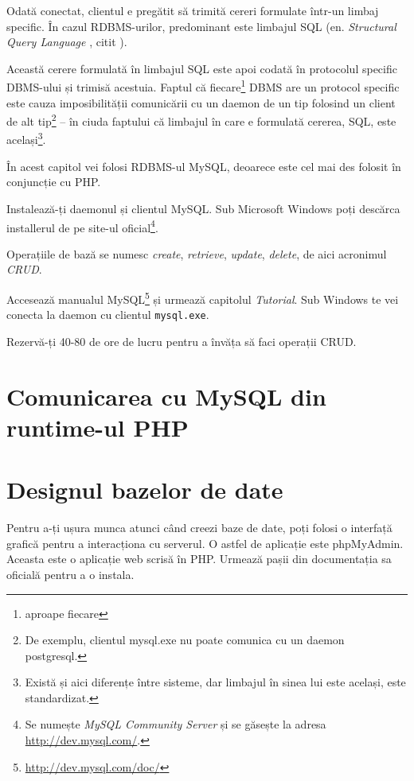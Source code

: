 Odată conectat, clientul e pregătit să trimită cereri formulate
într-un limbaj specific. În cazul RDBMS-urilor, predominant este
limbajul SQL (en. \textsl{Structural Query Language}
, citit \texttt{}).%

Această cerere formulată în limbajul SQL este apoi codată în
protocolul specific DBMS-ului și trimisă acestuia.
Faptul că fiecare\footnote{aproape fiecare} DBMS are un protocol
specific este cauza imposibilității comunicării cu un daemon
de un tip folosind un client de alt tip\footnote{De exemplu,
clientul mysql.exe nu poate comunica cu un daemon postgresql.}
-- în ciuda faptului că limbajul în care e formulată cererea, SQL,
este același\footnote{Există și aici diferențe între sisteme,
dar limbajul în sinea lui este același, este standardizat.}.

În acest capitol vei folosi RDBMS-ul MySQL, deoarece este
cel mai des folosit în conjuncție cu PHP.

\begin{Exercise}[title={Primii pași în baze de date}]
\ExePart

Instalează-ți daemonul și clientul MySQL. Sub Microsoft
Windows poți descărca installerul de pe site-ul
oficial\footnote{Se numește \textit{MySQL Community Server} și se găsește
la adresa \url{http://dev.mysql.com/}.}.

\ExePart

Operațiile de bază se numesc \textit{create}, \textit{retrieve},
\textit{update}, \textit{delete}, de aici acronimul \textsl{CRUD}.

Accesează manualul MySQL\footnote{\url{http://dev.mysql.com/doc/}}
și urmează capitolul \textit{Tutorial}. Sub Windows te vei conecta la daemon
cu clientul \texttt{mysql.exe}.

Rezervă-ți 40-80 de ore de lucru pentru a învăța să faci operații CRUD.
\end{Exercise}

\section{Comunicarea cu MySQL din runtime-ul PHP}

\section{Designul bazelor de date}
Pentru a-ți ușura munca atunci când creezi baze de date, poți folosi o interfață grafică
pentru a interacționa cu serverul. O astfel de aplicație este phpMyAdmin.
Aceasta este o aplicație web scrisă în PHP.
Urmează pașii
din documentația sa oficială pentru a o instala.

